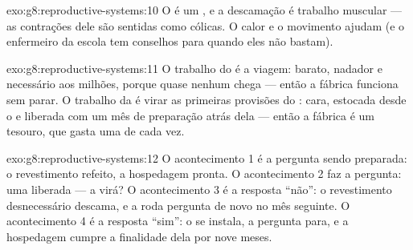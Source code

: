 \begin{solution}{exo:g8:reproductive-systems:10}
O  é um , e a descamação é trabalho muscular --- as
contrações dele são sentidas como cólicas. O calor e o movimento
ajudam (e o enfermeiro da escola tem conselhos para quando eles não
bastam).
\end{solution}

\begin{solution}{exo:g8:reproductive-systems:11}
O trabalho do  é a viagem: barato, nadador e necessário
aos milhões, porque quase nenhum chega --- então a fábrica funciona sem
parar. O trabalho da  é virar as primeiras
provisões do : cara, estocada desde o  e liberada com
um mês de preparação atrás dela --- então a fábrica é um tesouro, que
gasta uma de cada vez.
\end{solution}

\begin{solution}{exo:g8:reproductive-systems:12}
O acontecimento 1 é a pergunta sendo preparada: o revestimento
refeito, a hospedagem pronta. O acontecimento 2 faz a pergunta: uma
 liberada --- a  virá? O
acontecimento 3 é a resposta ``não'': o revestimento desnecessário
descama, e a roda pergunta de novo no mês seguinte. O acontecimento 4
é a resposta ``sim'': o  se instala, a pergunta para, e a
hospedagem cumpre a finalidade dela por nove meses.
\end{solution}

